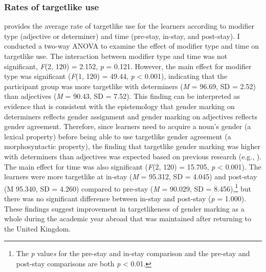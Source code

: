 \documentclass[output=paper,colorlinks,citecolor=brown,modfonts,nonflat]{../langscibook}
\begin{document}
\subsubsection{Rates of targetlike use}\label{sec:gudmestad:3.2.1}
\largerpage
{} provides the average rate of targetlike use for the learners according to modifier type (adjective or determiner) and time (pre-stay, in-stay, and post-stay). I conducted a two-way ANOVA to examine the effect of modifier type and time on targetlike use. The interaction between modifier type and time was not significant, \textit{F}(2, 120) = 2.152, \textit{p} = 0.121. However, the main effect for modifier type was significant (\textit{F}(1, 120) = 49.44, \textit{p} < 0.001), indicating that the participant group was more targetlike with determiners (\textit{M} = 96.69, SD = 2.52) than adjectives (\textit{M} = 90.43, SD = 7.52).  This finding can be interpreted as evidence that is consistent with the epistemology that gender marking on determiners reflects gender assignment and gender marking on adjectives reflects gender agreement. Therefore, since learners need to acquire a noun’s gender (a lexical property) before being able to use targetlike gender agreement (a morphosyntactic property), the finding that targetlike gender marking was higher with determiners than adjectives was expected based on previous research (e.g., \citealt{Alarcón2010}). The main effect for time was also significant (\textit{F}(2, 120) = 15.705, \textit{p} < 0.001). The learners were more targetlike at in-stay (\textit{M} = 95.312, SD = 4.045) and post-stay (M 95.340, SD = 4.260) compared to pre-stay (\textit{M} = 90.029, SD = 8.456),\footnote{The \textit{p} value\textit{s} for the pre-stay and in-stay comparison and the pre-stay and post-stay comparisons are both \textit{p} < 0.01.} but there was no significant difference between in-stay and post-stay (\textit{p} = 1.000). These findings suggest improvement in targetlikeness of gender marking as a whole during the academic year abroad that was maintained after returning to the United Kingdom.


\begin{table}
\caption{Rates of targetlike use (in percentages)\label{tab:gudmestad:2}}
\end{table}
\end{document}
